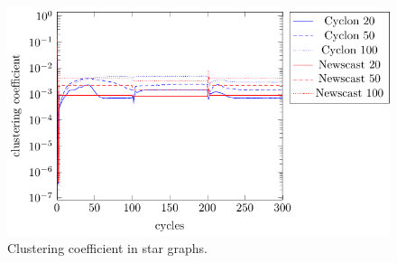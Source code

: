 \documentclass[a4paper]{ifacconf}
\begin{document}
\begin{figure}[p]
    \centering
    \includegraphics[width=.9\linewidth]{"figures/clustering_coefficient/clustering coefficient star"}
    \caption{Clustering coefficient in star graphs.}
    \label{fig:clustering-coefficient-star}
\end{figure}
\end{document}
